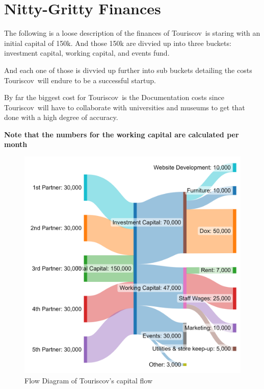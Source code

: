 \documentclass[12pt]{article}
\newcommand{\tco}{Touriscov}
\begin{document}
\section{Nitty-Gritty Finances}
The following is a loose description of the finances of \tco\ is staring with an initial capital of 150k. And those 150k are divvied up into three buckets: investment capital, working capital, and events fund.\ \par

\noindent
And each one of those is divvied up further into sub buckets detailing the costs \tco\ will endure to be a successful startup.\ \par

\noindent
By far the biggest cost for \tco\ is the Documentation costs since \tco\ will have to collaborate with universities and museums to get that done with a high degree of accuracy.\ \par

\begin{center}
    \textbf{Note that the numbers for the working capital are calculated per month}
\end{center}

\vspace{1em}

\begin{figure}[h]
    \centering
    \includegraphics[scale=0.15]{capitalDistFlowDiagram.png}
    \caption{Flow Diagram of Touriscov's capital flow}
\end{figure}
\end{document}
